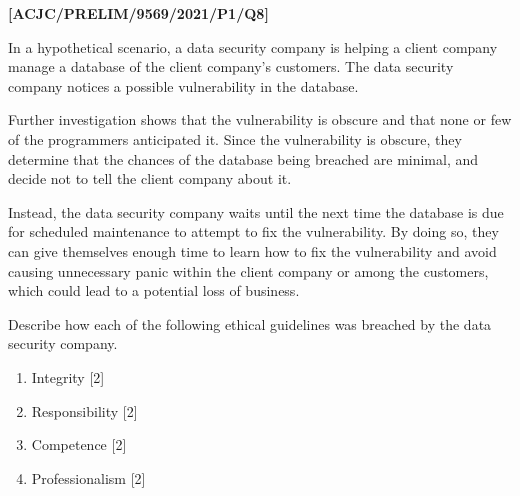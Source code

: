 \item \textbf{{[}ACJC/PRELIM/9569/2021/P1/Q8{]} }

In a hypothetical scenario, a data security company is helping a client
company manage a database of the client company\textquoteright s customers.
The data security company notices a possible vulnerability in the
database.

Further investigation shows that the vulnerability is obscure and
that none or few of the programmers anticipated it. Since the vulnerability
is obscure, they determine that the chances of the database being
breached are minimal, and decide not to tell the client company about
it. 

Instead, the data security company waits until the next time the database
is due for scheduled maintenance to attempt to fix the vulnerability.
By doing so, they can give themselves enough time to learn how to
fix the vulnerability and avoid causing unnecessary panic within the
client company or among the customers, which could lead to a potential
loss of business.

Describe how each of the following ethical guidelines was breached
by the data security company.
\begin{enumerate}
\item Integrity \hfill{}{[}2{]}
\item Responsibility \hfill{}{[}2{]}
\item Competence \hfill{}{[}2{]}
\item Professionalism \hfill{}{[}2{]}
\end{enumerate}